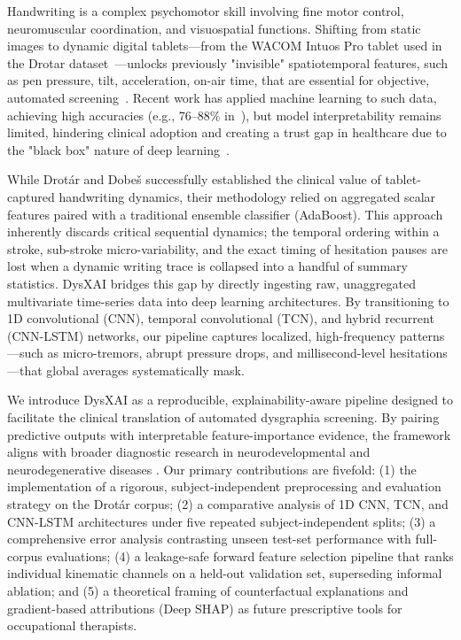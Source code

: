 \documentclass{article}
\begin{document}
Handwriting is a complex psychomotor skill involving fine motor control, neuromuscular coordination, and visuospatial functions. Shifting from static images to dynamic digital tablets---from the WACOM Intuos Pro tablet used in the Drotar dataset~\cite{drotar2020}---unlocks previously "invisible" spatiotemporal features, such as pen pressure, tilt, acceleration, on-air time, that are essential for objective, automated screening~\cite{drotar2020, kunhoth2022}. Recent work has applied machine learning to such data, achieving high accuracies (e.g., 76--88\% in~\cite{kunhoth2022, kunhoth2024multimodal}), but model interpretability remains limited, hindering clinical adoption and creating a trust gap in healthcare due to the "black box" nature of deep learning~\cite{asselborn2020, js2019ad}.

While Drotár and Dobeš \cite{drotar2020} successfully established the clinical value of tablet-captured handwriting dynamics, their methodology relied on aggregated scalar features paired with a traditional ensemble classifier (AdaBoost). This approach inherently discards critical sequential dynamics; the temporal ordering within a stroke, sub-stroke micro-variability, and the exact timing of hesitation pauses are lost when a dynamic writing trace is collapsed into a handful of summary statistics. DysXAI bridges this gap by directly ingesting raw, unaggregated multivariate time-series data into deep learning architectures. By transitioning to 1D convolutional (CNN), temporal convolutional (TCN), and hybrid recurrent (CNN-LSTM) networks, our pipeline captures localized, high-frequency patterns—such as micro-tremors, abrupt pressure drops, and millisecond-level hesitations—that global averages systematically mask.

We introduce DysXAI as a reproducible, explainability-aware pipeline designed to facilitate the clinical translation of automated dysgraphia screening. By pairing predictive outputs with interpretable feature-importance evidence, the framework aligns with broader diagnostic research in neurodevelopmental and neurodegenerative diseases \cite{js2019ad}. Our primary contributions are fivefold: (1) the implementation of a rigorous, subject-independent preprocessing and evaluation strategy on the Drotár corpus; (2) a comparative analysis of 1D CNN, TCN, and CNN-LSTM architectures under five repeated subject-independent splits; (3) a comprehensive error analysis contrasting unseen test-set performance with full-corpus evaluations; (4) a leakage-safe forward feature selection pipeline that ranks individual kinematic channels on a held-out validation set, superseding informal ablation; and (5) a theoretical framing of counterfactual explanations and gradient-based attributions (Deep SHAP) as future prescriptive tools for occupational therapists.
\end{document}
